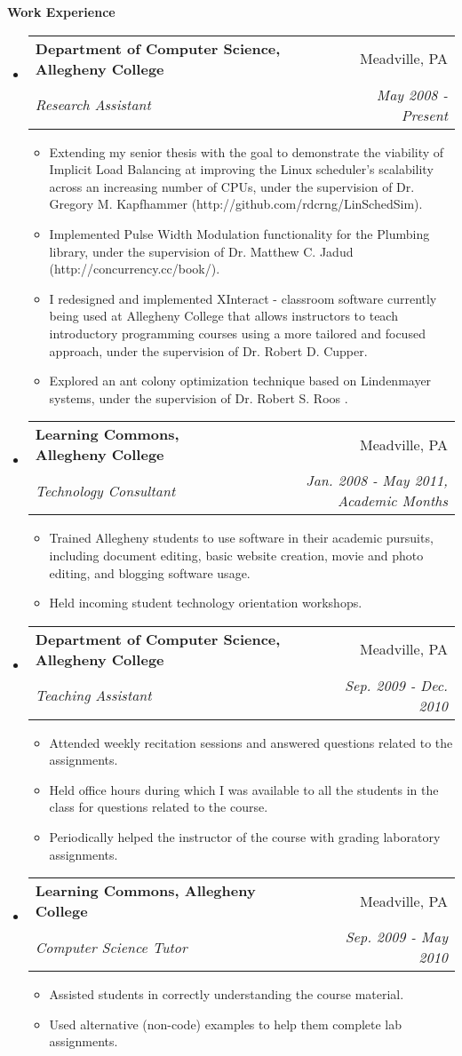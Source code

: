 \documentclass[letterpaper,12pt]{article}
\makeatletter
\newcommand{\resitem}[1]{\item #1 \vspace{-2pt}}
\newcommand{\resheading}[1]{{\large \colorbox{mygrey}{\begin{minipage}{\textwidth}{\textbf{#1 \vphantom{p\^{E}}}}\end{minipage}}}}
\newcommand{\ressubheading}[4]{
\begin{tabular*}{7.0in}{l@{\extracolsep{\fill}}r}
		\textbf{#1} & #2 \\
		\textit{#3} & \textit{#4} \\
\end{tabular*}\vspace{-6pt}}
\makeatother
\begin{document}
\resheading{Work Experience}
\begin{itemize}
\item
	\ressubheading{Department of Computer Science, Allegheny College}{Meadville, PA}{Research Assistant}{May 2008 - Present}
	\begin{itemize}
	    \resitem{Extending my senior thesis with the goal to demonstrate the viability of Implicit Load Balancing at improving the Linux scheduler's scalability across an increasing number of CPUs, under the supervision of Dr. Gregory M. Kapfhammer (http://github.com/rdcrng/LinSchedSim).}
		\resitem{Implemented Pulse Width Modulation functionality for the Plumbing library, under the supervision of Dr. Matthew C. Jadud (http://concurrency.cc/book/).}
		\resitem{I redesigned and implemented XInteract - classroom software currently being used at Allegheny College that allows instructors to teach introductory programming courses using a more tailored and focused approach, under the supervision of Dr. Robert D. Cupper.}
		\resitem{Explored an ant colony optimization technique based on Lindenmayer systems, under the supervision of Dr. Robert S. Roos .}
	\end{itemize}
	
\item
	\ressubheading{Learning Commons, Allegheny College}{Meadville, PA}{Technology Consultant}{Jan. 2008 - May 2011, Academic Months}
	\begin{itemize}
		\resitem{Trained Allegheny students to use software in their academic pursuits, including document editing, basic website creation, movie and photo editing, and blogging software usage.}
		\resitem{Held incoming student technology orientation workshops.}
	\end{itemize}

\item
	\ressubheading{Department of Computer Science, Allegheny College}{Meadville, PA}{Teaching Assistant}{Sep. 2009 - Dec. 2010}
	\begin{itemize}
		\resitem{Attended weekly recitation sessions and answered questions related to the assignments.}
		\resitem{Held office hours during which I was available to all the students in the class for questions related to the course.}
		\resitem{Periodically helped the instructor of the course with grading laboratory assignments.}
	\end{itemize}

\item
	\ressubheading{Learning Commons, Allegheny College}{Meadville, PA}{Computer Science Tutor}{Sep. 2009 - May 2010}
	\begin{itemize}
		\resitem{Assisted students in correctly understanding the course material.}
		\resitem{Used alternative (non-code) examples to help them complete lab assignments.}
	\end{itemize}
	
\end{itemize}
\end{document}
